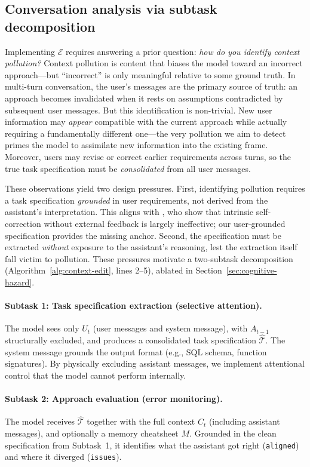 \documentclass{article} %
\begin{document}
\subsection{Conversation analysis via subtask decomposition}
\label{sec:decomposition}

Implementing $\mathcal{E}$ requires answering a prior question: \emph{how do you identify context pollution?} Context pollution is content that biases the model toward an incorrect approach---but ``incorrect'' is only meaningful relative to some ground truth. In multi-turn conversation, the user's messages are the primary source of truth: an approach becomes invalidated when it rests on assumptions contradicted by subsequent user messages. But this identification is non-trivial. New user information may \emph{appear} compatible with the current approach while actually requiring a fundamentally different one---the very pollution we aim to detect primes the model to assimilate new information into the existing frame. Moreover, users may revise or correct earlier requirements across turns, so the true task specification must be \emph{consolidated} from all user messages.

These observations yield two design pressures. First, identifying pollution requires a task specification \emph{grounded} in user requirements, not derived from the assistant's interpretation. This aligns with \citet{kamoi2024criticalselfcorrect}, who show that intrinsic self-correction without external feedback is largely ineffective; our user-grounded specification provides the missing anchor. Second, the specification must be extracted \emph{without} exposure to the assistant's reasoning, lest the extraction itself fall victim to pollution. These pressures motivate a two-subtask decomposition (Algorithm~\ref{alg:context-edit}, lines 2--5), ablated in Section~\ref{sec:cognitive-hazard}.

\paragraph{Subtask 1: Task specification extraction (selective attention).}
The model sees only $U_t$ (user messages and system message), with $A_{t-1}$ structurally excluded, and produces a consolidated task specification $\hat{\mathcal{T}}$. The system message grounds the output format (e.g., SQL schema, function signatures). By physically excluding assistant messages, we implement attentional control that the model cannot perform internally.

\paragraph{Subtask 2: Approach evaluation (error monitoring).}
The model receives $\hat{\mathcal{T}}$ together with the full context $C_t$ (including assistant messages), and optionally a memory cheatsheet $M$. Grounded in the clean specification from Subtask~1, it identifies what the assistant got right (\texttt{aligned}) and where it diverged (\texttt{issues}).
\end{document}
